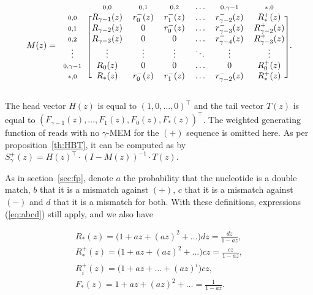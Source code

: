 \documentclass{article}
\begin{document}
\begin{equation*}
M(z) =
\begin{blockarray}{ccccccc}
   & \scriptstyle{0,0} & \scriptstyle{0,1} & \scriptstyle{0,2}
   & \ldots & \scriptstyle{0,\gamma-1} & \scriptstyle{*,0} \\
\begin{block}{c[cccccc]}
\scriptstyle{0,0} & R_{\gamma-1}(z) &
    r_0^-(z) & r_1^-(z) & \ldots & r_{\gamma-2}^-(z) & R_*^+(z) \\
\scriptstyle{0,1} & R_{\gamma-2}(z) & 0 & r_0^-(z) &
    \ldots & r_{\gamma-3}^-(z) & R_{\gamma-2}^+(z) \\
\scriptstyle{0,2} & R_{\gamma-3}(z) & 0 & 0 &
    \ldots & r_{\gamma-4}^-(z) & R_{\gamma-3}^+(z)  \\
\vdots & \vdots & \vdots & \vdots & \ddots & \vdots & \vdots \\
\scriptstyle{0,\gamma-1} & R_0(z) & 0 & 0 & \ldots & 0 & R_0^+(z) \\
\scriptstyle{*,0} & R_*(z) &
    r_0^-(z) & r_1^-(z) & \ldots & r_{\gamma-2}^-(z) & R_*^+(z) \\
\end{block}
\end{blockarray}.
\end{equation*}


The head vector $H(z)$ is equal to $(1,0,\ldots,0)^\top$ and the tail
vector $T(z)$ is equal to $(F_{\gamma-1}(z), \ldots, F_1(z), F_0(z),
F_*(z))^\top$. The weighted generating function of reads with no
$\gamma$-MEM for the $(+)$ sequence is omitted here. As per
proposition~\ref{th:HBT}, it can be computed as by $S^+_\gamma(z) =
H(z)^\top \cdot (I-M(z))^{-1} \cdot T(z)$.


As in section~\ref{sec:fp}, denote $a$ the probability that the nucleotide
is a double match, $b$ that it is a mismatch against $(+)$, $c$ that it is
a mismatch against $(-)$ and $d$ that it is a mismatch for both. With
these definitions, expressions (\ref{eq:abcd}) still apply, and we also
have

\begin{equation*}
\begin{gathered}
R_*(z) = \big(1 + az + (az)^2 + \ldots \big)dz = \frac{dz}{1-az}, \\
R_*^+(z) = \big(1 + az + (az)^2 + \ldots \big)cz = \frac{cz}{1-az}, \\
R_i^+(z) = \big(1 + az + \ldots  + (az)^i\big)cz, \\
F_*(z) = 1 + az + (az)^2 + \ldots = \frac{1}{1-az}.
\end{gathered}
\end{equation*}
\end{document}
